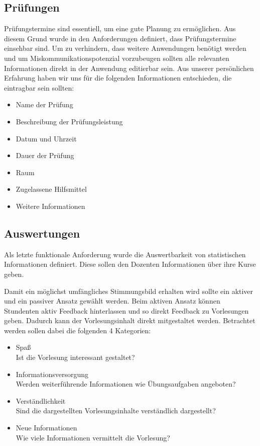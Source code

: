 \subsection{Prüfungen}
Prüfungstermine sind essentiell, um eine gute Planung zu ermöglichen.
Aus diesem Grund wurde in den Anforderungen definiert, dass Prüfungstermine einsehbar sind.
Um zu verhindern, dass weitere Anwendungen benötigt werden und um Miskommunikationspotenzial vorzubeugen sollten alle relevanten Informationen direkt in der Anwendung editierbar sein.
Aus unserer persönlichen Erfahrung haben wir uns für die folgenden Informationen entschieden, die eintragbar sein sollten:
\begin{itemize}
    \item Name der Prüfung
    \item Beschreibung der Prüfungsleistung
    \item Datum und Uhrzeit
    \item Dauer der Prüfung
    \item Raum
    \item Zugelassene Hilfsmittel
    \item Weitere Informationen
\end{itemize} 

\subsection{Auswertungen}
Als letzte funktionale Anforderung wurde die Auswertbarkeit von statistischen Informationen definiert. Diese sollen den Dozenten Informationen über ihre Kurse geben.

Damit ein möglichst umfängliches Stimmungsbild erhalten wird sollte ein aktiver und ein passiver Ansatz gewählt werden.
Beim aktiven Ansatz können Stundenten aktiv Feedback hinterlassen und so direkt Feedback zu Vorlesungen geben. Dadurch kann der Vorlesungsinhalt direkt mitgestaltet werden. Betrachtet werden sollen dabei die folgenden 4 Kategorien:
\begin{itemize}
    \item Spaß\\
        Ist die Vorlesung interessant gestaltet?
    \item Informationsversorgung\\
        Werden weiterführende Informationen wie Übungsaufgaben angeboten?
    \item Verständlichkeit\\
        Sind die dargestellten Vorlesungsinhalte verständlich dargestellt?
    \item Neue Informationen\\
        Wie viele Informationen vermittelt die Vorlesung?
\end{itemize}


